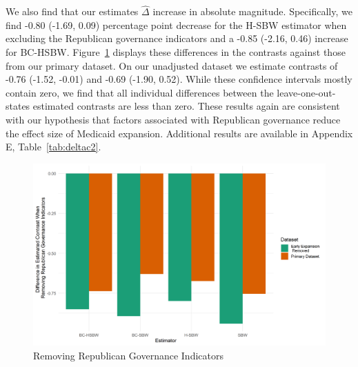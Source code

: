 \documentclass[aoas]{imsart}
\theoremstyle{plain}
\theoremstyle{remark}
\begin{document}
We also find that our estimates $\hat{\Delta}$ increase in absolute magnitude. Specifically, we find -0.80 (-1.69, 0.09) percentage point decrease for the H-SBW estimator when excluding the Republican governance indicators and a -0.85 (-2.16, 0.46) increase for BC-HSBW. Figure~\ref{fig:repub} displays these differences in the contrasts against those from our primary dataset. On our unadjusted dataset we estimate contrasts of -0.76 (-1.52, -0.01) and -0.69 (-1.90, 0.52). While these confidence intervals mostly contain zero, we find that all individual differences between the leave-one-out-states estimated contrasts are less than zero. These results again are consistent with our hypothesis that factors associated with Republican governance reduce the effect size of Medicaid expansion. Additional results are available in Appendix E, Table~\ref{tab:deltac2}. 

\begin{figure}
\begin{center}
    \caption{Removing Republican Governance Indicators}
    \label{fig:repub}
    \includegraphics[scale=0.6]{01_Plots/repub-diff-c1c2.png}
\end{center}
\end{figure}
\end{document}
